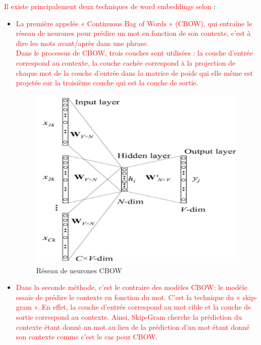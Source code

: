      \textcolor{red}{Il existe principalement deux techniques de word embeddings selon \cite{we1}} :
    
    \begin{itemize}
    \item  \textcolor{red}{La première appelée « Continuous Bag of Words » (CBOW), qui entraîne le réseau de neurones pour prédire un mot en fonction de son contexte, c’est à dire les mots avant/après dans une phrase.\\
    Dans le processus de CBOW, trois couches sont utilisées : la couche d'entrée correspond au contexte, la couche cachée correspond à la projection de chaque mot de la couche d'entrée dans la matrice de poids qui elle même  est projetée sur la troisième couche qui est la couche de sortie.\\ }
   
         \begin{figure}[H]
        	\centering
        	\includegraphics[height=250pt,width=300pt]{img/chapter2/Cbow.png}
        	\caption{Réseau de neurones CBOW\cite{cbow}}
        \end{figure}
        
    
     \item  \textcolor{red}{Dans la seconde méthode, c'est le contraire des modèles CBOW: le modèle essaie de prédire le contexte en fonction du mot. C’est la technique du « skip-gram ». En effet, la couche d'entrée correspond au mot cible
     et la couche de sortie correspond au contexte. Ainsi, Skip-Gram cherche la prédiction du contexte étant donné un mot au lieu de la prédiction d'un mot étant donné son contexte comme c'est le cas pour CBOW.\\}
    

\end{itemize}
